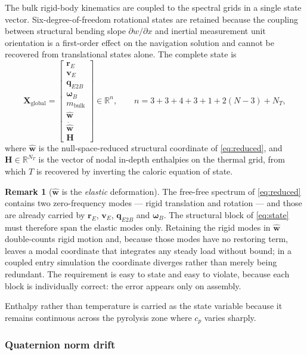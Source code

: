\documentclass[11pt,a4paper]{article}
\theoremstyle{definition}
\newtheorem{remark}[theorem]{Remark}
\numberwithin{equation}{section}
\newcommand{\R}{\mathbb{R}}
\begin{document}
The bulk rigid-body kinematics are coupled to the spectral grids in a single state vector. Six-degree-of-freedom rotational states are retained because the coupling between structural bending slope $\partial w/\partial x$ and inertial measurement unit orientation is a first-order effect on the navigation solution and cannot be recovered from translational states alone. The complete state is
\begin{equation}
\label{eq:state}
\mathbf{X}_{\text{global}} = \begin{bmatrix} \mathbf{r}_E \\ \mathbf{v}_E \\ \mathbf{q}_{E2B} \\ \bm{\omega}_B \\ m_{\text{bulk}} \\ \hat{\mathbf{w}} \\ \dot{\hat{\mathbf{w}}} \\ \mathbf{H} \end{bmatrix}
\in \R^{n}, \qquad
n = 3 + 3 + 4 + 3 + 1 + 2(N - 3) + N_T,
\end{equation}
where $\hat{\mathbf{w}}$ is the null-space-reduced structural coordinate of \cref{eq:reduced}, and $\mathbf{H} \in \R^{N_T}$ is the vector of nodal in-depth enthalpies on the thermal grid, from which $T$ is recovered by inverting the caloric equation of state.

\begin{remark}[$\hat{\mathbf{w}}$ is the \emph{elastic} deformation]
\label{rem:elastic}
The free-free spectrum of \cref{eq:reduced} contains two zero-frequency modes --- rigid translation and rotation --- and those are already carried by $\mathbf{r}_E$, $\mathbf{v}_E$, $\mathbf{q}_{E2B}$ and $\bm{\omega}_B$. The structural block of \cref{eq:state} must therefore span the elastic modes only. Retaining the rigid modes in $\hat{\mathbf{w}}$ double-counts rigid motion and, because those modes have no restoring term, leaves a modal coordinate that integrates any steady load without bound; in a coupled entry simulation the coordinate diverges rather than merely being redundant. The requirement is easy to state and easy to violate, because each block is individually correct: the error appears only on assembly.
\end{remark} Enthalpy rather than temperature is carried as the state variable because it remains continuous across the pyrolysis zone where $c_p$ varies sharply.

\subsubsection{Quaternion norm drift}
\end{document}
